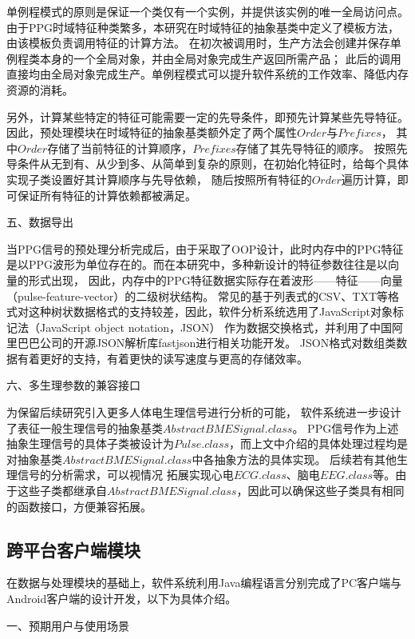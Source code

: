 单例程模式的原则是保证一个类仅有一个实例，并提供该实例的唯一全局访问点。
由于PPG时域特征种类繁多，本研究在时域特征的抽象基类中定义了模板方法，
由该模板负责调用特征的计算方法。
在初次被调用时，生产方法会创建并保存单例程类本身的一个全局对象，并由全局对象完成生产返回所需产品；
此后的调用直接均由全局对象完成生产。单例程模式可以提升软件系统的工作效率、降低内存资源的消耗。

另外，计算某些特定的特征可能需要一定的先导条件，即预先计算某些先导特征。因此，预处理模块在时域特征的抽象基类额外定了两个属性$Order$与$Prefixes$，
其中$Order$存储了当前特征的计算顺序，$Prefixes$存储了其先导特征的顺序。
按照先导条件从无到有、从少到多、从简单到复杂的原则，在初始化特征时，给每个具体实现子类设置好其计算顺序与先导依赖，
随后按照所有特征的$Order$遍历计算，即可保证所有特征的计算依赖都被满足。

五、数据导出

当PPG信号的预处理分析完成后，由于采取了OOP设计，此时内存中的PPG特征是以PPG波形为单位存在的。而在本研究中，多种新设计的特征参数往往是以向量的形式出现，
因此，内存中的PPG特征数据实际存在着波形——特征——向量（pulse-feature-vector）的二级树状结构。
常见的基于列表式的CSV、TXT等格式对这种树状数据格式的支持较差，因此，软件分析系统选用了JavaScript对象标记法（JavaScript object notation，JSON）\cite{json}
作为数据交换格式，并利用了中国阿里巴巴公司的开源JSON解析库fastjson\cite{fastjson}进行相关功能开发。
JSON格式对数组类数据有着更好的支持，有着更快的读写速度与更高的存储效率。


六、多生理参数的兼容接口

为保留后续研究引入更多人体电生理信号进行分析的可能，
软件系统进一步设计了表征一般生理信号的抽象基类$AbstractBMESignal.class$。
PPG信号作为上述抽象生理信号的具体子类被设计为$Pulse.class$，而上文中介绍的具体处理过程均是对抽象基类$AbstractBMESignal.class$中各抽象方法的具体实现。
后续若有其他生理信号的分析需求，可以视情况
拓展实现心电$ECG.class$、脑电$EEG.class$等。由于这些子类都继承自$AbstractBMESignal.class$，因此可以确保这些子类具有相同的函数接口，方便兼容拓展。

\subsection{跨平台客户端模块}

在数据与处理模块的基础上，软件系统利用Java编程语言分别完成了PC客户端与Android客户端的设计开发，以下为具体介绍。

一、预期用户与使用场景

